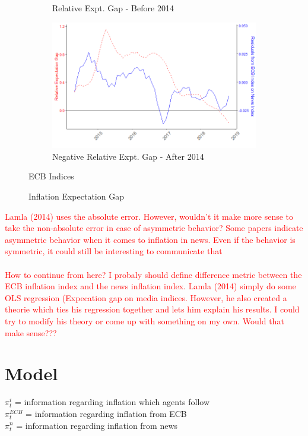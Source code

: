 \documentclass[review]{elsarticle}
\begin{document}
\begin{figure}[h!]
\begin{subfigure}{6cm}
    \caption{Relative Expt. Gap - Before 2014}
    \label{ECB_inf}
\end{subfigure}
\hfil
\begin{subfigure}{6cm}
    \includegraphics{rel_exp_res_aft2014.png}
    \caption{Negative Relative Expt. Gap - After 2014}
    \label{ECB_inf}
\end{subfigure}
\caption{ECB Indices}
\caption{Inflation Expectation Gap}
\label{fig:Expectation Gap}
    \end{figure}


\textcolor{red}{Lamla (2014) uses the absolute error. However, wouldn't it make more sense to take the non-absolute error in case of asymmetric behavior? Some papers indicate asymmetric behavior when it comes to inflation in news. Even if the behavior is symmetric, it could still be interesting to communicate that}
\\
\\
\textcolor{red}{How to continue from here? I probaly should define difference metric between the ECB inflation index and the news inflation index. Lamla (2014) simply do some OLS regression (Expecation gap on media indices. However, he also created a theorie which ties his regression together and lets him explain his results. I could try to modify his theory or come up with something on my own. Would that make sense???}

\section{Model}\label{sec:Model}

$\pi^i_t$ = information regarding inflation which agents follow \\
$\pi^{ECB}_t$ = information regarding inflation from ECB \\
$\pi^n_t$ = information regarding inflation from news \\
\end{document}
